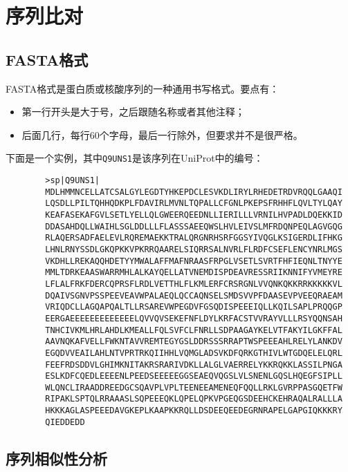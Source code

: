 \section{序列比对}

\subsection{FASTA格式}

FASTA格式是蛋白质或核酸序列的一种通用书写格式。要点有：
\begin{itemize}
	\item 第一行开头是大于号，之后跟随名称或者其他注释；
	\item 后面几行，每行60个字母，最后一行除外，但要求并不是很严格。
\end{itemize}

下面是一个实例，其中\texttt{Q9UNS1}是该序列在UniProt中的编号：

\begin{verbatim}
		>sp|Q9UNS1|
		MDLHMMNCELLATCSALGYLEGDTYHKEPDCLESVKDLIRYLRHEDETRDVRQQLGAAQI
		LQSDLLPILTQHHQDKPLFDAVIRLMVNLTQPALLCFGNLPKEPSFRHHFLQVLTYLQAY
		KEAFASEKAFGVLSETLYELLQLGWEERQEEDNLLIERILLLVRNILHVPADLDQEKKID
		DDASAHDQLLWAIHLSGLDDLLLFLASSSAEEQWSLHVLEIVSLMFRDQNPEQLAGVGQG
		RLAQERSADFAELEVLRQREMAEKKTRALQRGNRHSRFGGSYIVQGLKSIGERDLIFHKG
		LHNLRNYSSDLGKQPKKVPKRRQAARELSIQRRSALNVRLFLRDFCSEFLENCYNRLMGS
		VKDHLLREKAQQHDETYYMWALAFFMAFNRAASFRPGLVSETLSVRTFHFIEQNLTNYYE
		MMLTDRKEAASWARRMHLALKAYQELLATVNEMDISPDEAVRESSRIIKNNIFYVMEYRE
		LFLALFRKFDERCQPRSFLRDLVETTHLFLKMLERFCRSRGNLVVQNKQKKRRKKKKKVL
		DQAIVSGNVPSSPEEVEAVWPALAEQLQCCAQNSELSMDSVVPFDAASEVPVEEQRAEAM
		VRIQDCLLAGQAPQALTLLRSAREVWPEGDVFGSQDISPEEEIQLLKQILSAPLPRQQGP
		EERGAEEEEEEEEEEEEELQVVQVSEKEFNFLDYLKRFACSTVVRAYVLLLRSYQQNSAH
		TNHCIVKMLHRLAHDLKMEALLFQLSVFCLFNRLLSDPAAGAYKELVTFAKYILGKFFAL
		AAVNQKAFVELLFWKNTAVVREMTEGYGSLDDRSSSRRAPTWSPEEEAHLRELYLANKDV
		EGQDVVEAILAHLNTVPRTRKQIIHHLVQMGLADSVKDFQRKGTHIVLWTGDQELELQRL
		FEEFRDSDDVLGHIMKNITAKRSRARIVDKLLALGLVAERRELYKKRQKKLASSILPNGA
		ESLKDFCQEDLEEEENLPEEDSEEEEEGGSEAEQVQGSLVLSNENLGQSLHQEGFSIPLL
		WLQNCLIRAADDREEDGCSQAVPLVPLTEENEEAMENEQFQQLLRKLGVRPPASGQETFW
		RIPAKLSPTQLRRAAASLSQPEEEQKLQPELQPKVPGEQGSDEEHCKEHRAQALRALLLA
		HKKKAGLASPEEEDAVGKEPLKAAPKKRQLLDSDEEQEEDEGRNRAPELGAPGIQKKKRY
		QIEDDEDD
\end{verbatim}

\subsection{序列相似性分析}

